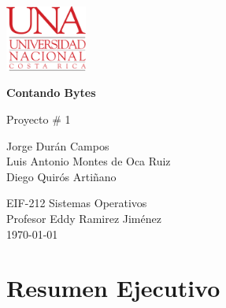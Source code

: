 \documentclass[10pt, article, natbib]{IEEEtran}
\begin{document}
\begin{titlepage}
	\includegraphics[width=0.2\textwidth]{./logo-UNA blanco.png}      
   	\begin{changemargin}{4.5cm}{0cm}
       	\textbf{\Huge Contando Bytes}

       	\vspace{0.2cm}
       	\LARGE Proyecto \# 1
            
       	\vspace{3cm}
		\Large
       	Jorge Durán Campos \\ 
       	Luis Antonio Montes de Oca Ruiz \\ 
       	Diego Quirós Artiñano \\ 

       	\vspace{3cm}
       
		EIF-212 Sistemas Operativos \\
       	Profesor Eddy Ramirez Jiménez \\
		       	
       	\vspace{3cm}
       	\today
	\end{changemargin}
\end{titlepage}

\onecolumn
    \renewcommand{\contentsname}{\large Índice \\ \hrulefill}
\tableofcontents
\setcounter{tocdepth}{2}
\newpage
 \renewcommand{\listfigurename}{\large Índice de fíguras \\ \hrulefill}
 \listoffigures
 \newpage
 \renewcommand{\listtablename}{\large Índice de tablas \\ \hrulefill}
 \listoftables
 \newpage


\section{Resumen Ejecutivo}


\newpage
\twocolumn
\end{document}
